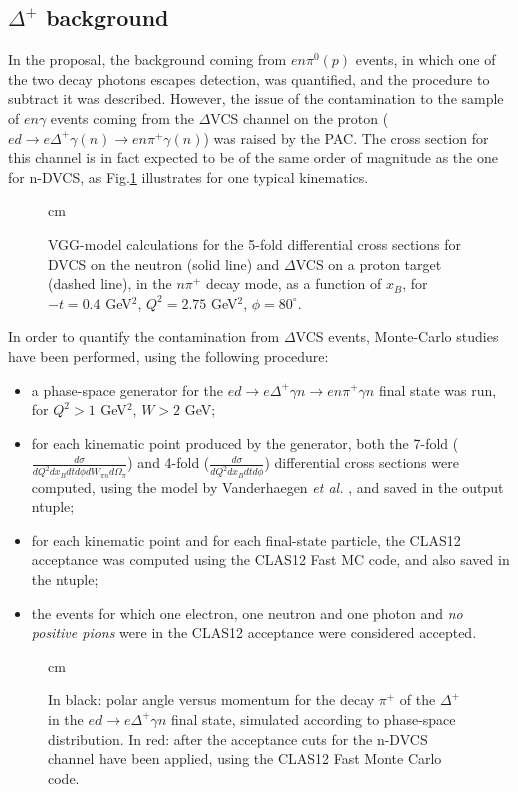 \documentclass[12pt,oneside]{article}
\begin{document}
{\subsection{$\Delta^+$ background}
In the proposal, the background coming from $en\pi^0(p)$ events, in which one of the two decay photons escapes detection, was quantified, and the procedure to subtract it was described. However, the issue of the contamination to the sample of $en\gamma$ events coming from the $\Delta$VCS channel on the proton ($ed\to e \Delta^+ \gamma(n) \to en\pi^+\gamma(n)$) was raised by the PAC. The cross section for this channel is in fact expected to be of the same order of magnitude as the one for n-DVCS, as Fig.\ref{delta_theory} illustrates for one typical kinematics. 
\begin{figure}[h]  
\begin{center}
 cm
\caption{VGG-model calculations \cite{marc} for the 5-fold differential cross sections for DVCS on the neutron (solid line) and $\Delta$VCS on a proton target (dashed line), in the $n\pi^+$ decay mode, as a function of $x_B$, for $-t=0.4$ GeV$^2$, $Q^2=2.75$ GeV$^2$, $\phi=80^{\circ}$.}
\label{delta_theory}
\end{center}
\end{figure}
In order to quantify the contamination from $\Delta$VCS events, Monte-Carlo studies have been performed, using the following procedure: 
\begin{itemize} 
\item{a phase-space generator for the $ed\to e \Delta^+ \gamma n\to en\pi^+\gamma n$ final state was run, for $Q^2>1$ GeV$^2$, $W>2$ GeV;}
\item{for each kinematic point produced by the generator, both the 7-fold ($\frac{d\sigma}{dQ^2dx_Bdtd\phi dW_{\pi n} d\Omega_{\pi}}$) and 4-fold ($\frac{d\sigma}{dQ^2dx_Bdtd\phi}$) differential cross sections were computed, using the model by Vanderhaegen {\it et al.} \cite{marc}, and saved in the output ntuple;}
\item{for each kinematic point and for each final-state particle, the CLAS12 acceptance was computed using the CLAS12 Fast MC code, and also saved in the ntuple;}
\item{the events for which one electron, one neutron and one photon and {\it no positive pions} were in the CLAS12 acceptance were considered accepted.}
\end{itemize}
\begin{figure}[h]  
\begin{center}
 cm
\caption{In black: polar angle versus momentum for the decay $\pi^+$ of the $\Delta^+$ in the $ed \to e\Delta^+\gamma n$ final state, simulated according to phase-space distribution. In red: after the acceptance cuts for the n-DVCS channel have been applied, using the CLAS12 Fast Monte Carlo code.}
\label{piplus_acc}
\end{center}
\end{figure}

}
\end{document}
